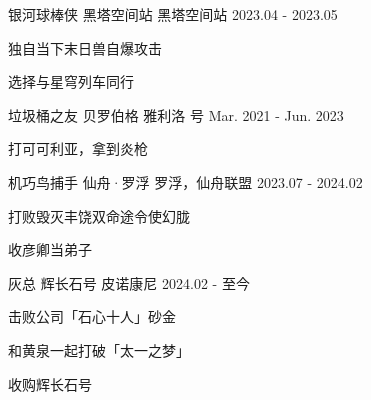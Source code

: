 

\begin{cventries}

  \cventry
    {银河球棒侠} %
    {黑塔空间站} %
    {黑塔空间站} %
    {2023.04 - 2023.05} %
    {
      \begin{cvitems} %
        \item 独自当下末日兽自爆攻击
        \item 选择与星穹列车同行
      \end{cvitems}
    }

  \cventry
    {垃圾桶之友} %
    {贝罗伯格} %
    {雅利洛 号} %
    {Mar. 2021 - Jun. 2023} %
    {
      \begin{cvitems} %
        \item 打可可利亚，拿到炎枪
      \end{cvitems}
    }

  \cventry
    {机巧鸟捕手} %
    {仙舟·罗浮} %
    {罗浮，仙舟联盟} %
    {2023.07 - 2024.02} %
    {
      \begin{cvitems} %
        \item 打败毁灭丰饶双命途令使幻胧
        \item 收彦卿当弟子
      \end{cvitems}
    }

  \cventry
    {灰总} %
    {辉长石号} %
    {皮诺康尼} %
    {2024.02 - 至今} %
    {
      \begin{cvitems} %
        \item 击败公司「石心十人」砂金
        \item 和黄泉一起打破「太一之梦」
        \item 收购辉长石号
      \end{cvitems}
    }

\end{cventries}
